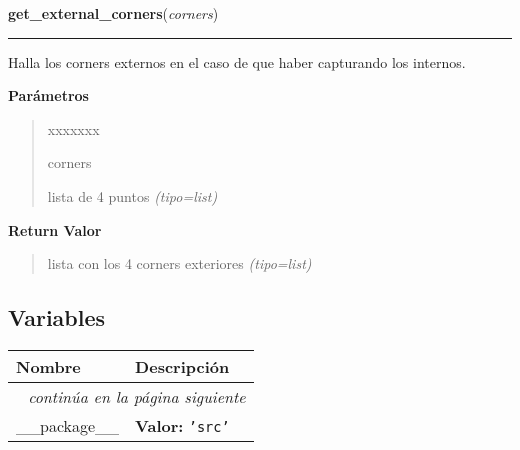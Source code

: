 \hspace{.8\funcindent}\begin{boxedminipage}{\funcwidth}

    \raggedright \textbf{get\_external\_corners}(\textit{corners})

    \vspace{-1.5ex}

    \rule{\textwidth}{0.5\fboxrule}
\setlength{\parskip}{2ex}
Halla los corners externos en el caso de que haber capturando los internos.

\setlength{\parskip}{1ex}
      \textbf{Parámetros}
      \vspace{-1ex}

      \begin{quote}
        \begin{Ventry}{xxxxxxx}

          \item[corners]


lista de 4 puntos
            {\it (tipo=list)}

        \end{Ventry}

      \end{quote}

      \textbf{Return Valor}
    \vspace{-1ex}

      \begin{quote}

lista con los 4 corners exteriores
      {\it (tipo=list)}

      \end{quote}

    \end{boxedminipage}



  \subsection{Variables}

    \vspace{-1cm}
\hspace{\varindent}\begin{longtable}{|p{\varnamewidth}|p{\vardescrwidth}|l}
\cline{1-2}
\cline{1-2} \centering \textbf{Nombre} & \centering \textbf{Descripción}& \\
\cline{1-2}
\endhead\cline{1-2}\multicolumn{3}{r}{\small\textit{continúa en la página siguiente}}\\\endfoot\cline{1-2}
\endlastfoot\raggedright \_\-\_\-p\-a\-c\-k\-a\-g\-e\-\_\-\_\- & \raggedright \textbf{Valor:} 
{\tt \texttt{'}\texttt{src}\texttt{'}}&\\
\cline{1-2}
\end{longtable}

